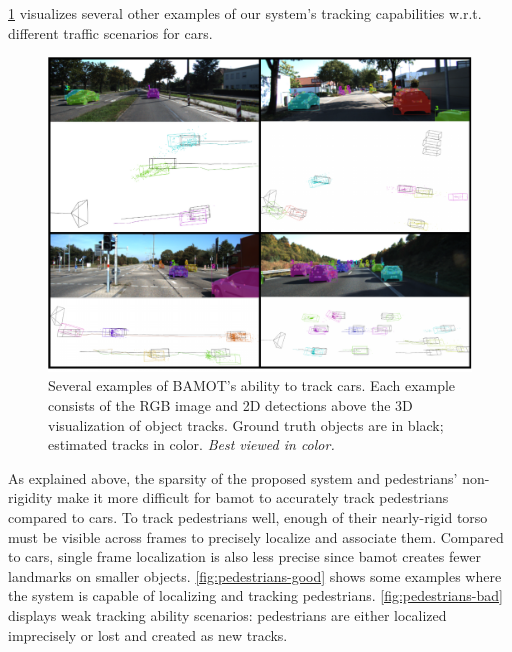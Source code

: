 \documentclass[headsepline, hidelinks, footsepline, footinclude=false, oneside, fontsize=11pt, paper=a4, listof=totoc, bibliography=totoc]{scrbook}
\begin{document}
\cref{fig:more-scenes} visualizes several other examples of our system's tracking capabilities w.r.t. different traffic scenarios for cars.
\begin{figure}[htbp]
\centering
\includegraphics[width=\textwidth]{figures/more-scenes.pdf}
\caption{\label{fig:more-scenes}Several examples of BAMOT's ability to track cars. Each example consists of the RGB image and 2D detections above the 3D visualization of object tracks. Ground truth objects are in black; estimated tracks in color. \emph{Best viewed in color.}}
\end{figure}


As explained above, the sparsity of the proposed system and pedestrians' non-rigidity make it more difficult for \gls{bamot} to accurately track pedestrians compared to cars.
To track pedestrians well, enough of their nearly-rigid torso must be visible across frames to precisely localize and associate them. 
Compared to cars, single frame localization is also less precise since \gls{bamot} creates fewer landmarks on smaller objects. 
\cref{fig:pedestrians-good} shows some examples where the system is capable of localizing and tracking pedestrians. 
\cref{fig:pedestrians-bad} displays weak tracking ability scenarios: pedestrians are either localized imprecisely or lost and created as new tracks.
\end{document}

